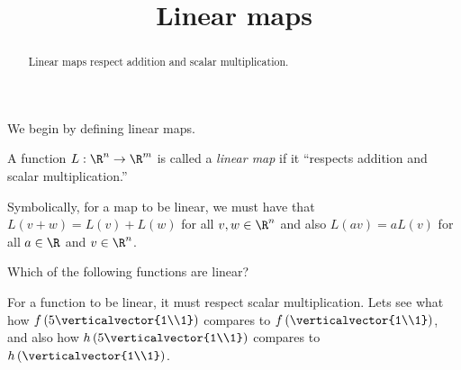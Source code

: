 \documentclass{ximera}
\title{Linear maps}
\begin{document}
\begin{abstract}
  Linear maps respect addition and scalar multiplication.
\end{abstract}

We begin by defining linear maps.

\begin{definition}
  A function $L: \R^n \to \R^m$ is called a \textit{linear map} if it
  ``respects addition and scalar multiplication.''

  Symbolically, for a map to be linear, we must have that $L(v+w) =
  L(v)+L(w)$ for all $v,w \in \R^n$ and also $L(av) = a L(v)$ for all
  $a \in \R$ and $v\in \R^n$.
\end{definition}

\begin{question}
  Which of the following functions are linear?
  \begin{solution}
    \begin{hint}
    	For a function to be linear, it must respect scalar multiplication.  Lets see what how $f\left(5 \verticalvector{1\\1}\right)$ compares to $f\left(\verticalvector{1\\1}\right)$, and also how
        $h\left(5 \verticalvector{1\\1}\right)$ compares to $h\left(\verticalvector{1\\1}\right)$.  
	

\end{hint}
\end{solution}
\end{question}
\end{document}
